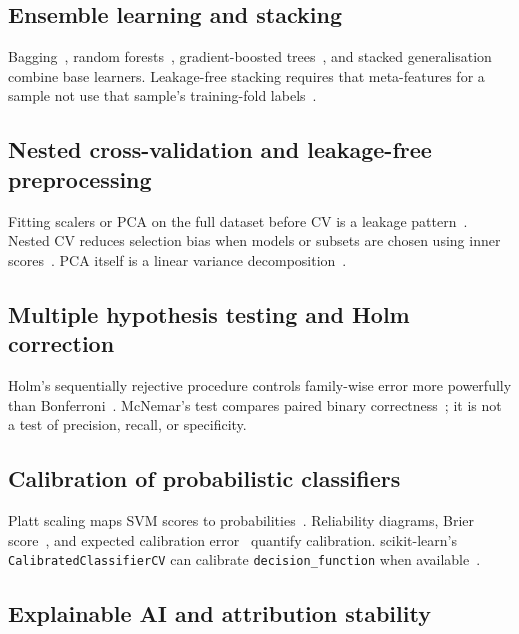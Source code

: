 \documentclass[11pt,a4paper]{article}
\begin{document}
\subsection{Ensemble learning and stacking}

Bagging~\cite{breiman1996bagging}, random forests~\cite{breiman2001random}, gradient-boosted trees~\cite{chen2016xgboost}, and stacked generalisation~\cite{wolpert1992stacked} combine base learners. Leakage-free stacking requires that meta-features for a sample not use that sample's training-fold labels~\cite{wolpert1992stacked,kapoor2023leakage}.

\subsection{Nested cross-validation and leakage-free preprocessing}

Fitting scalers or PCA on the full dataset before CV is a leakage pattern~\cite{kapoor2023leakage}. Nested CV reduces selection bias when models or subsets are chosen using inner scores~\cite{varma2006bias,cawley2010overfitting}. PCA itself is a linear variance decomposition~\cite{jolliffe2016pca}.

\subsection{Multiple hypothesis testing and Holm correction}

Holm's sequentially rejective procedure controls family-wise error more powerfully than Bonferroni~\cite{holm1979simple}. McNemar's test compares paired binary correctness~\cite{mcnemar1947note,dietterich1998approximate}; it is not a test of precision, recall, or specificity.

\subsection{Calibration of probabilistic classifiers}

Platt scaling maps SVM scores to probabilities~\cite{platt1999probabilistic}. Reliability diagrams, Brier score~\cite{brier1950verification}, and expected calibration error~\cite{naeini2015obtaining,niculescu2005predicting} quantify calibration. scikit-learn's \texttt{CalibratedClassifierCV} can calibrate \texttt{decision\_function} when available~\cite{pedregosa2011scikit}.

\subsection{Explainable AI and attribution stability}
\end{document}
